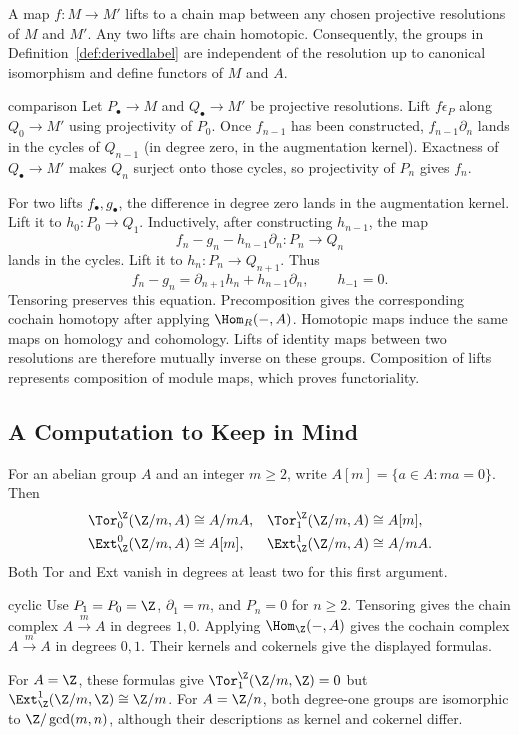 \documentclass[11pt]{article}
\begin{document}
\begin{proposition}\label{prop:comparison}
A map $f:M\to M'$ lifts to a chain map between any chosen projective resolutions of $M$ and $M'$. Any two lifts are chain homotopic. Consequently, the groups in Definition~\ref{def:derivedlabel} are independent of the resolution up to canonical isomorphism and define functors of $M$ and $A$.
\end{proposition}
\begin{linkedproof}{comparison}
Let $P_\bullet\to M$ and $Q_\bullet\to M'$ be projective resolutions. Lift $f\epsilon_P$ along $Q_0\to M'$ using projectivity of $P_0$. Once $f_{n-1}$ has been constructed, $f_{n-1}\partial_n$ lands in the cycles of $Q_{n-1}$ (in degree zero, in the augmentation kernel). Exactness of $Q_\bullet\to M'$ makes $Q_n$ surject onto those cycles, so projectivity of $P_n$ gives $f_n$.

For two lifts $f_\bullet,g_\bullet$, the difference in degree zero lands in the augmentation kernel. Lift it to $h_0:P_0\to Q_1$. Inductively, after constructing $h_{n-1}$, the map
\[
f_n-g_n-h_{n-1}\partial_n:P_n\longrightarrow Q_n
\]
lands in the cycles. Lift it to $h_n:P_n\to Q_{n+1}$. Thus
\[
f_n-g_n=\partial_{n+1}h_n+h_{n-1}\partial_n,
\qquad h_{-1}=0.
\]
Tensoring preserves this equation. Precomposition gives the corresponding cochain homotopy after applying $\Hom_R(-,A)$. Homotopic maps induce the same maps on homology and cohomology. Lifts of identity maps between two resolutions are therefore mutually inverse on these groups. Composition of lifts represents composition of module maps, which proves functoriality.
\end{linkedproof}

\subsection{A Computation to Keep in Mind}
\begin{proposition}\label{prop:cyclic}
For an abelian group $A$ and an integer $m\geq2$, write $A[m]=\{a\in A:ma=0\}$. Then
\[
\begin{aligned}
\Tor_0^{\Z}(\Z/m,A)&\cong A/mA,&
\Tor_1^{\Z}(\Z/m,A)&\cong A[m],\\
\Ext_{\Z}^0(\Z/m,A)&\cong A[m],&
\Ext_{\Z}^1(\Z/m,A)&\cong A/mA.
\end{aligned}
\]
Both Tor and Ext vanish in degrees at least two for this first argument.
\end{proposition}
\begin{linkedproof}{cyclic}
Use $P_1=P_0=\Z$, $\partial_1=m$, and $P_n=0$ for $n\geq2$. Tensoring gives the chain complex $A\xrightarrow{m}A$ in degrees $1,0$. Applying $\Hom_{\Z}(-,A)$ gives the cochain complex $A\xrightarrow{m}A$ in degrees $0,1$. Their kernels and cokernels give the displayed formulas.
\end{linkedproof}
For $A=\Z$, these formulas give $\Tor_1^{\Z}(\Z/m,\Z)=0$ but $\Ext_{\Z}^1(\Z/m,\Z)\cong\Z/m$. For $A=\Z/n$, both degree-one groups are isomorphic to $\Z/\gcd(m,n)$, although their descriptions as kernel and cokernel differ.
\end{document}
